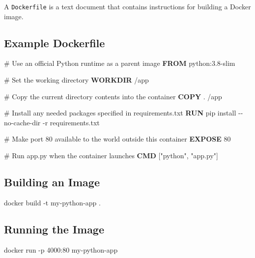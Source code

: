 \documentclass[
  letterpaper,
  DIV=11,
  numbers=noendperiod]{scrreprt}
\newenvironment{Shaded}{\begin{snugshade}}{\end{snugshade}}
\newcommand{\AttributeTok}[1]{\textcolor[rgb]{0.40,0.45,0.13}{#1}}
\newcommand{\CommentTok}[1]{\textcolor[rgb]{0.37,0.37,0.37}{#1}}
\newcommand{\ExtensionTok}[1]{\textcolor[rgb]{0.00,0.23,0.31}{#1}}
\newcommand{\KeywordTok}[1]{\textcolor[rgb]{0.00,0.23,0.31}{\textbf{#1}}}
\newcommand{\NormalTok}[1]{\textcolor[rgb]{0.00,0.23,0.31}{#1}}
\newcommand{\StringTok}[1]{\textcolor[rgb]{0.13,0.47,0.30}{#1}}
\begin{document}
A \texttt{Dockerfile} is a text document that contains instructions for
building a Docker image.

\subsection{Example Dockerfile}\label{example-dockerfile}

\begin{Shaded}
\begin{Highlighting}[]
\CommentTok{\# Use an official Python runtime as a parent image}
\KeywordTok{FROM}\NormalTok{ python:3.8{-}slim}

\CommentTok{\# Set the working directory}
\KeywordTok{WORKDIR}\NormalTok{ /app}

\CommentTok{\# Copy the current directory contents into the container}
\KeywordTok{COPY}\NormalTok{ . /app}

\CommentTok{\# Install any needed packages specified in requirements.txt}
\KeywordTok{RUN} \ExtensionTok{pip}\NormalTok{ install }\AttributeTok{{-}{-}no{-}cache{-}dir} \AttributeTok{{-}r}\NormalTok{ requirements.txt}

\CommentTok{\# Make port 80 available to the world outside this container}
\KeywordTok{EXPOSE}\NormalTok{ 80}

\CommentTok{\# Run app.py when the container launches}
\KeywordTok{CMD}\NormalTok{ [}\StringTok{"python"}\NormalTok{, }\StringTok{"app.py"}\NormalTok{]}
\end{Highlighting}
\end{Shaded}

\subsection{Building an Image}\label{building-an-image}

\begin{Shaded}
\begin{Highlighting}[]
\ExtensionTok{docker}\NormalTok{ build }\AttributeTok{{-}t}\NormalTok{ my{-}python{-}app .}
\end{Highlighting}
\end{Shaded}

\subsection{Running the Image}\label{running-the-image}

\begin{Shaded}
\begin{Highlighting}[]
\ExtensionTok{docker}\NormalTok{ run }\AttributeTok{{-}p}\NormalTok{ 4000:80 my{-}python{-}app}
\end{Highlighting}
\end{Shaded}
\end{document}
